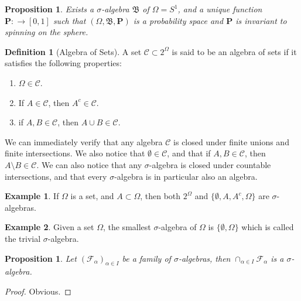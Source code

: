 \documentclass[11pt,a4paper]{article}
\theoremstyle{definition}
\newtheorem{definition}{Definition}[section]
\newtheorem{example}{Example}[section]
\theoremstyle{plain}
\newtheorem{proposition}[theorem]{Proposition}
\begin{document}
  \begin{proposition}
    Exists a $\sigma$-algebra $\mathfrak B$ of $\Omega = S^1$, and a unique
    function $\mathbf P \colon \mathfrak \to [0,1]$ such that 
    $(\Omega, \mathfrak B, \mathbf P)$ is a probability space and $\mathbf P$
    is invariant to spinning on the sphere.
  \end{proposition}

  \begin{definition}[Algebra of Sets]
    A set $\mathcal C \subset 2^\Omega$ is said to be an algebra of sets if it 
    satisfies the following properties:
    \begin{enumerate}
      \item $\Omega \in \mathcal C$.
      \item If $A \in \mathcal C$, then $A^c \in \mathcal C$.
      \item if $A,B \in \mathcal C$, then $A \cup B \in \mathcal C$.
    \end{enumerate}
  \end{definition}

  We can immediately verify that any algebra $\mathcal C$ is closed under
  finite unions and finite intersections. We also notice that 
  $\emptyset \in \mathcal C$, and that if $A,B \in \mathcal C$, then
  $A \setminus B \in \mathcal C$. We can also notice that any 
  $\sigma$-algebra is closed under countable intersections, and that
  every $\sigma$-algebra is in particular also an algebra.

  \begin{example}
    If $\Omega$ is a set, and $A \subset \Omega$, then both $2^\Omega$ and 
    $\{\emptyset, A, A^c, \Omega\}$ are $\sigma$-algebras.
  \end{example}

  \begin{example}
    Given a set $\Omega$, the smallest $\sigma$-algebra of $\Omega$ is
    $\{\emptyset, \Omega\}$ which is called the trivial $\sigma$-algebra.
  \end{example}
  
  \begin{proposition}
    Let $(\mathcal F_\alpha)_{\alpha \in I}$ be a family of $\sigma$-algebras,
    then $\cap_{\alpha \in I}{\mathcal F_\alpha}$ is a $\sigma$-algebra.
  \end{proposition}
  \begin{proof}
    Obvious.
  \end{proof}
\end{document}
